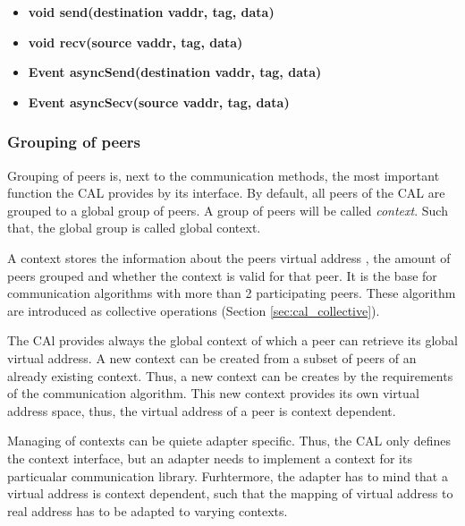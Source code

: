 \begin{itemize}
  \item  \textbf{void send(destination vaddr, tag, data)}
  \item  \textbf{void recv(source vaddr, tag, data)}
  \item  \textbf{Event asyncSend(destination vaddr, tag, data)}
  \item  \textbf{Event asyncSecv(source vaddr, tag, data)}
\end{itemize}

\subsubsection{Grouping of peers}
\label{sec:cal_context}
Grouping of peers is, next to the communication methods, the most
important function the CAL provides by its interface.  By default, all
peers of the CAL are grouped to a global group of peers.  A group of
peers will be called \textit{context}. Such that, the global group is
called global context.

A context stores the information about the peers virtual address , the
amount of peers grouped and whether the context is valid for that
peer. It is the base for communication algorithms with more than 2
participating peers. These algorithm are introduced as collective
operations (Section \ref{sec:cal_collective}).

The CAl provides always the global context of which a peer
can retrieve its global virtual address. A new context can
be created from a subset of peers of an already existing
context. Thus, a new context can be creates by the
requirements of the communication algorithm. This new context
provides its own virtual address space, thus, the virtual
address of a peer is context dependent.

Managing of contexts can be quiete adapter specific. Thus, the CAL
only defines the context interface, but an adapter needs to implement
a context for its particualar communication library. Furhtermore, the
adapter has to mind that a virtual address is context dependent, such
that the mapping of virtual address to real address has to be adapted
to varying contexts.

